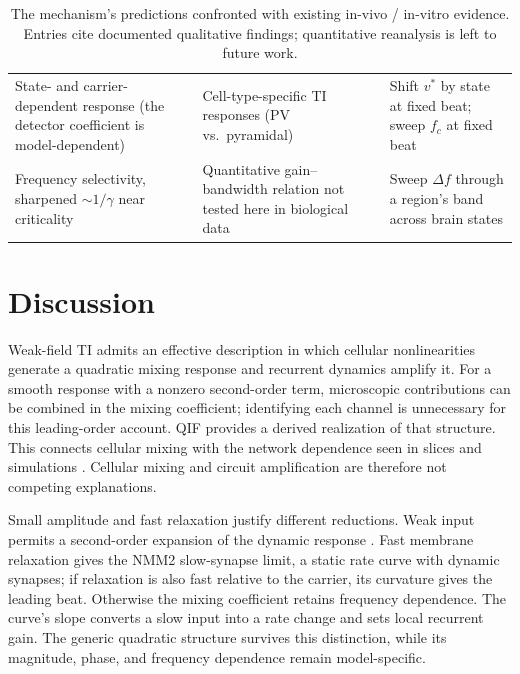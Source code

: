 \documentclass[11pt,a4paper]{article}
\providecommand{\DIFdeltex}[1]{{\protect\color{red} \scriptsize #1}} %
\providecommand{\DIFdelbegin}{} %
\providecommand{\DIFdel}[1]{\texorpdfstring{\DIFdeltex{#1}}{}} %
\begin{document}
\begin{table}[h]
\begin{tabular}{@{}>{\raggedright\arraybackslash}p{} >{\raggedright\arraybackslash}p{} >{\raggedright\arraybackslash}p{}@{}}
State- and carrier-dependent response (the detector coefficient is model-dependent) &
Cell-type-specific TI responses (PV vs.\ pyramidal) \cite{caldas2024} & Shift $v^*$ by
state at fixed beat; sweep $f_c$ at fixed beat \\
Frequency selectivity, sharpened $\sim1/\gamma$ near criticality & Quantitative
gain--bandwidth relation not tested here in biological data & Sweep $\Delta f$ through a region's band across brain
states \\
\bottomrule
\end{tabular}
\caption{The mechanism's predictions confronted with existing in-vivo / in-vitro evidence.
Entries cite documented qualitative findings; quantitative reanalysis is left to future
work.}\label{tab:predictions}
\end{table}

\section{Discussion}\label{sec:discussion}
\DIFdelbegin \DIFdel{Weak-field TI admits an effective description in which cellular nonlinearities
generate a quadratic mixing response and recurrent dynamics amplify it. For a
smooth response with a nonzero second-order term, microscopic contributions can
be combined in the mixing coefficient; identifying each channel is unnecessary
for this leading-order account. QIF provides a derived realization of that
structure. This connects cellular mixing \cite{mirzakhalili2020,luff2024mixer}
with the network dependence seen in slices and simulations
\cite{caldas2024,karimi2024,soroushi2025}.
Cellular mixing and circuit amplification
are therefore not competing explanations.}%

\DIFdel{Small amplitude and fast relaxation justify different reductions. Weak input
permits a second-order expansion of the dynamic response . Fast membrane
relaxation gives the NMM2 slow-synapse limit, a static rate curve with dynamic
synapses; if relaxation is also fast relative to the carrier, its curvature
gives the leading beat. Otherwise the mixing coefficient retains frequency
dependence. The curve's slope converts a slow input into a rate change and sets
local recurrent gain.
The generic quadratic structure survives this distinction,
while its magnitude, phase, and frequency dependence remain model-specific.}%
\end{document}
